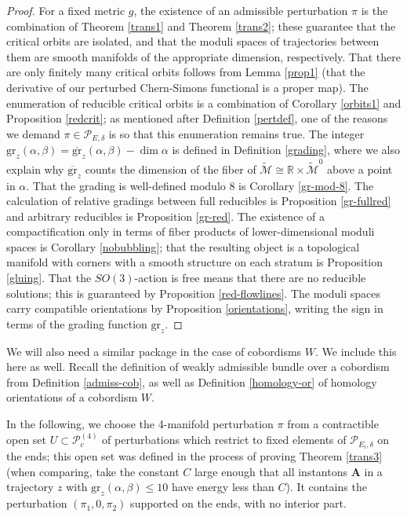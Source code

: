 \documentclass{memo-l}
\theoremstyle{definition}
\theoremstyle{remark}
\numberwithin{section}{chapter}
\numberwithin{equation}{chapter}
\begin{document}
\begin{proof}For a fixed metric $g$, the existence of an admissible perturbation $\pi$ is the combination of Theorem \ref{trans1} and Theorem \ref{trans2}; these guarantee that the critical orbits are isolated, and that the moduli spaces of trajectories between them are smooth manifolds of the appropriate dimension, respectively. That there are only finitely many critical orbits follows from Lemma \ref{prop1} (that the derivative of our perturbed Chern-Simons functional is a proper map). The enumeration of reducible critical orbits is a combination of Corollary \ref{orbits1} and Proposition \ref{redcrit}; as mentioned after Definition \ref{pertdef}, one of the reasons we demand $\pi \in \mathcal P_{E,\delta}$ is so that this enumeration remains true. The integer $\text{gr}_z(\alpha, \beta) = \overline{\text{gr}}_z(\alpha, \beta) - \dim \alpha$ is defined in Definition \ref{grading}, where we also explain why $\overline{\text{gr}}_z$ counts the dimension of the fiber of $\widetilde{\mathcal M} \cong \mathbb R \times \widetilde{\mathcal M}^0$ above a point in $\alpha$. That the grading is well-defined modulo $8$ is Corollary \ref{gr-mod-8}. The calculation of relative gradings between full reducibles is Proposition \ref{gr-fullred} and arbitrary reducibles is Proposition \ref{gr-red}. The existence of a compactification only in terms of fiber products of lower-dimensional moduli spaces is Corollary \ref{nobubbling}; that the resulting object is a topological manifold with corners with a smooth structure on each stratum is Proposition \ref{gluing}. That the $SO(3)$-action is free means that there are no reducible solutions; this is guaranteed by Proposition \ref{red-flowlines}. The moduli spaces carry compatible orientations by Proposition \ref{orientations}, writing the sign in terms of the grading function $\text{gr}_z$.
\end{proof}

We will also need a similar package in the case of cobordisms $W$. We include this here as well. Recall the definition of weakly admissible bundle over a cobordism from Definition \ref{admiss-cob}, as well as Definition \ref{homology-or} of homology orientations of a cobordism $W$.

In the following, we choose the 4-manifold perturbation $\pi$ from a contractible open set $U \subset \mathcal P^{(4)}_c$ of perturbations which restrict to fixed elements of $\mathcal P_{E_i, \delta}$ on the ends; this open set was defined in the process of proving Theorem \ref{trans3} (when comparing, take the constant $C$ large enough that all instantons $\mathbf{A}$ in a trajectory $z$ with $\text{gr}_z(\alpha, \beta) \leq 10$ have energy less than $C$). It contains the perturbation $(\pi_1, 0, \pi_2)$ supported on the ends, with no interior part. 
\end{document}
